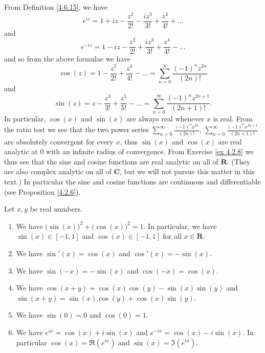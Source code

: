 \begin{additional corollary}\label{ac 4.7.1}
From Definition \ref{4.6.15}, we have
\[
    e^{i z} = 1 + i z - \frac{z^2}{2!} - \frac{i z^3}{3!} + \frac{z^4}{4!} + \dots
\]
and
\[
    e^{- i z} = 1 - i z - \frac{z^2}{2!} + \frac{i z^3}{3!} + \frac{z^4}{4!} - \dots
\]
and so from the above formulae we have
\[
    \cos(z) = 1 - \frac{z^2}{2!} + \frac{z^4}{4!} - \dots = \sum_{n = 0}^\infty \frac{(-1)^n z^{2n}}{(2n)!}
\]
and
\[
    \sin(z) = z - \frac{z^3}{3!} + \frac{z^5}{5!} - \dots = \sum_{n = 0}^\infty \frac{(-1)^n z^{2n + 1}}{(2n + 1)!}.
\]
In particular, \(\cos(x)\) and \(\sin(x)\) are always real whenever \(x\) is real.
From the ratio test we see that the two power series \(\sum_{n = 0}^\infty \frac{(-1)^n x^{2n}}{(2n)!}\), \(\sum_{n = 0}^\infty \frac{(-1)^n x^{2n + 1}}{(2n + 1)!}\) are absolutely convergent for every \(x\), thus \(\sin(x)\) and \(\cos(x)\) are real analytic at \(0\) with an infinite radius of convergence.
From Exercise \ref{ex 4.2.8} we thus see that the sine and cosine functions are real analytic on all of \(\mathbf{R}\).
(They are also complex analytic on all of \(\mathbf{C}\), but we will not pursue this matter in this text.)
In particular the sine and cosine functions are continuous and differentiable (see Proposition \ref{4.2.6}).
\end{additional corollary}

\begin{theorem}\label{4.7.2}
    Let \(x, y\) be real numbers.
    \begin{enumerate}
        \item We have \(\big(\sin(x)\big)^2 + \big(\cos(x)\big)^2 = 1\).
              In particular, we have \(\sin(x) \in [-1, 1]\) and \(\cos(x) \in [-1, 1]\) for all \(x \in \mathbf{R}\).
        \item We have \(\sin'(x) = \cos(x)\) and \(\cos'(x) = -\sin(x)\).
        \item We have \(\sin(-x) = -\sin(x)\) and \(\cos(-x) = \cos(x)\).
        \item We have \(\cos(x + y) = \cos(x) \cos(y) - \sin(x) \sin(y)\) and \(\sin(x + y) = \sin(x) \cos(y) + \cos(x) \sin(y)\).
        \item We have \(\sin(0) = 0\) and \(\cos(0) = 1\).
        \item We have \(e^{i x} = \cos(x) + i \sin(x)\) and \(e^{- i x} = \cos(x) - i \sin(x)\).
              In particular \(\cos(x) = \Re(e^{i x})\) and \(\sin(x) = \Im(e^{i x})\).
    \end{enumerate}
\end{theorem}

